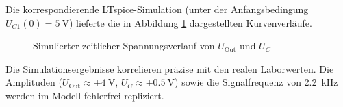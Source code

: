 Die korrespondierende LTspice-Simulation (unter der Anfangsbedingung $U_{C1}(0) = \qty{5}{\volt}$) lieferte die in Abbildung \ref{fig:9} dargestellten Kurvenverläufe.
\begin{figure}[H]
        \centering
        \caption{Simulierter zeitlicher Spannungsverlauf von $U_{\text{Out}}$ und $U_C$}
        \label{fig:9}
\end{figure}
Die Simulationsergebnisse korrelieren präzise mit den realen Laborwerten. Die Amplituden ($U_{\text{Out}} \approx \pm\qty{4}{\volt}$, $U_C \approx \pm\qty{0,5}{\volt}$) sowie die Signalfrequenz von \qty{2,2}{\kilo\hertz} werden im Modell fehlerfrei repliziert.

